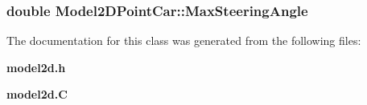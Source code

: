 \subsubsection{\setlength{\rightskip}{0pt plus 5cm}double Model2DPoint\-Car::Max\-Steering\-Angle}\label{classModel2DPointCar_m0}




The documentation for this class was generated from the following files:\begin{CompactItemize}
\item 
{\bf model2d.h}\item 
{\bf model2d.C}\end{CompactItemize}
